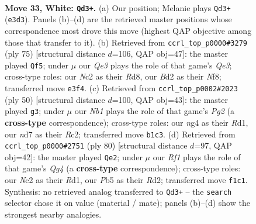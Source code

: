 \documentclass[11pt]{article}
\begin{document}
\clearpage

\begin{figure}[p]\centering
\begin{subfigure}{0.46\textwidth}\centering
\resizebox{\linewidth}{!}{%
\newchessgame
\chessboard[
  setfen={r2q1r2/3n1pbk/3p4/1Ppb3p/p5nP/P3Q1P1/1PNB4/RN3RK1 w - - 0 33},
  showmover=false,
  pgfstyle=straightmove, color=movearrow, markmove={e3-d3}
]}
\caption{}
\end{subfigure}\hfill
\begin{subfigure}{0.46\textwidth}\centering
\resizebox{\linewidth}{!}{%
\newchessgame
\chessboard[
  setfen={3r1n1k/p1r1n1b1/1pp1q1pp/8/1P1P1P2/PBN2R2/5B1P/1Q4RK b - - 16 38},
  showmover=false,
  pgfstyle=straightmove, color=movearrow, markmove={e6-f5}
]}
\caption{}
\end{subfigure}
\\[4pt]
\begin{subfigure}{0.46\textwidth}\centering
\resizebox{\linewidth}{!}{%
\newchessgame
\chessboard[
  setfen={r2r2k1/1b3p2/1q4pp/1P1p4/p1pN4/P1QnPB1P/2R2PP1/3R2K1 w - - 0 26},
  showmover=false,
  pgfstyle=straightmove, color=movearrow, markmove={g2-g3}
]}
\caption{}
\end{subfigure}\hfill
\begin{subfigure}{0.46\textwidth}\centering
\resizebox{\linewidth}{!}{%
\newchessgame
\chessboard[
  setfen={br1r2k1/1q3pp1/1p3b1p/pNnPNB1P/5PQ1/Pp4P1/3R3K/3R4 w - - 9 41},
  showmover=false,
  pgfstyle=straightmove, color=movearrow, markmove={g4-e2}
]}
\caption{}
\end{subfigure}
\caption{\textbf{Move 33, White: \texttt{Qd3+}.} (a) Our position; Melanie plays \texttt{Qd3+} (\texttt{e3d3}). Panels (b)--(d) are the retrieved master positions whose correspondence most drove this move (highest QAP objective among those that transfer to it). (b) Retrieved from \texttt{ccrl\_top\_p0000\#3279} (ply 75) [structural distance $d$=106, QAP obj=47]: the master played \texttt{Qf5}; under $\mu$ our \emph{Qe3} plays the role of that game's \emph{Qe3}; cross-type roles: our \emph{N}c2 as their \emph{R}d8, our \emph{B}d2 as their \emph{N}f8; transferred move \texttt{e3f4}. (c) Retrieved from \texttt{ccrl\_top\_p0002\#2023} (ply 50) [structural distance $d$=100, QAP obj=43]: the master played \texttt{g3}; under $\mu$ our \emph{Nb1} plays the role of that game's \emph{Pg2} (a \textbf{cross-type} correspondence); cross-type roles: our \emph{n}g4 as their \emph{R}d1, our \emph{n}d7 as their \emph{R}c2; transferred move \texttt{b1c3}. (d) Retrieved from \texttt{ccrl\_top\_p0000\#2751} (ply 80) [structural distance $d$=97, QAP obj=42]: the master played \texttt{Qe2}; under $\mu$ our \emph{Rf1} plays the role of that game's \emph{Qg4} (a \textbf{cross-type} correspondence); cross-type roles: our \emph{N}c2 as their \emph{R}d1, our \emph{P}b5 as their \emph{R}d2; transferred move \texttt{f1c1}. Synthesis: no retrieved analog transferred to \texttt{Qd3+} -- the \texttt{search} selector chose it on value (material / mate); panels (b)--(d) show the strongest nearby analogies.}
\label{fig:thought-m64}
\end{figure}
\end{document}
